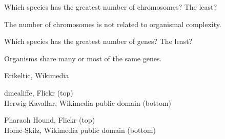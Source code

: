 \documentclass[t]{beamer}
\begin{document}
{
\begin{frame}[b]{Which species has the greatest number of chromosomes? The least?}

\end{frame}
}
%
%
{
\begin{frame}[b]{The number of chromosomes is not related to organismal complexity.}

\end{frame}
}
%
%
{
\begin{frame}[b]{Which species has the greatest number of genes? The least?}

\end{frame}
}
%
%
{
\begin{frame}[b]{Organisms share many or most of the same genes.}

\end{frame}
}
%
%
{
\begin{frame}[b]

\tiny Erikeltic, Wikimedia 
\end{frame}
}
%
{
\begin{frame}[b]
	
\tiny  dmealiffe, Flickr  (top)\\Herwig Kavallar, Wikimedia public domain (bottom)
\end{frame}
}
%

{
\begin{frame}[b]
	
\tiny  Pharaoh Hound, Flickr  (top)\\Home-Skilz, Wikimedia public domain (bottom)
\end{frame}
}
\end{document}
